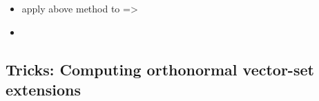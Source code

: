 \begin{itemize}
\begin{itemize}
                        \begin{itemize}

                              \item
                                    apply above method to  =\textgreater{}
                              \item
                        \end{itemize}
            \end{itemize}
\end{itemize}

\subsection*{Tricks: Computing orthonormal vector-set
      extensions}

